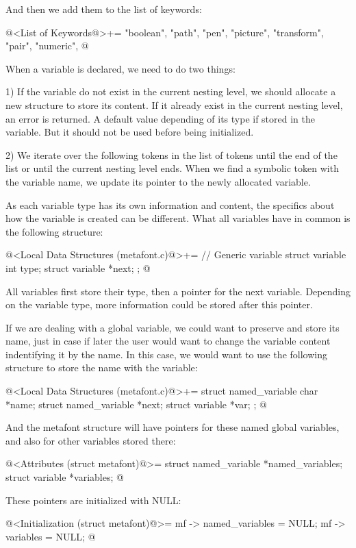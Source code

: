 And then we add them to the list of keywords:

\iniciocodigo
@<List of Keywords@>+=
"boolean", "path", "pen", "picture", "transform", "pair", "numeric",
@
\fimcodigo


When a variable is declared, we need to do two things:

1) If the variable do not exist in the current nesting level, we
should allocate a new structure to store its content. If it already
exist in the current nesting level, an error is returned. A default
value depending of its type if stored in the variable. But it should
not be used before being initialized.

2) We iterate over the following tokens in the list of tokens until
the end of the list or until the current nesting level ends. When we
find a symbolic token with the variable name, we update its pointer to
the newly allocated variable.

As each variable type has its own information and content, the
specifics about how the variable is created can be different. What all
variables have in common is the following structure:

\iniciocodigo
@<Local Data Structures (metafont.c)@>+=
// Generic variable
struct variable{
  int type;
  struct variable *next;
};
@
\fimcodigo

All variables first store their type, then a pointer for the next
variable. Depending on the variable type, more information could be
stored after this pointer.

If we are dealing with a global variable, we could want to preserve
and store its name, just in case if later the user would want to
change the variable content indentifying it by the name. In this case,
we would want to use the following structure to store the name with
the variable:

\iniciocodigo
@<Local Data Structures (metafont.c)@>+=
struct named_variable{
  char *name;
  struct named_variable *next;
  struct variable *var;
};
@
\fimcodigo

And the metafont structure will have pointers for these named global
variables, and also for other variables stored there:

\iniciocodigo
@<Attributes (struct metafont)@>=
  struct named_variable *named_variables;
  struct variable *variables;
@
\fimcodigo

These pointers are initialized with NULL:

\iniciocodigo
@<Initialization (struct metafont)@>=
mf -> named_variables = NULL;
mf -> variables = NULL;
@
\fimcodigo

